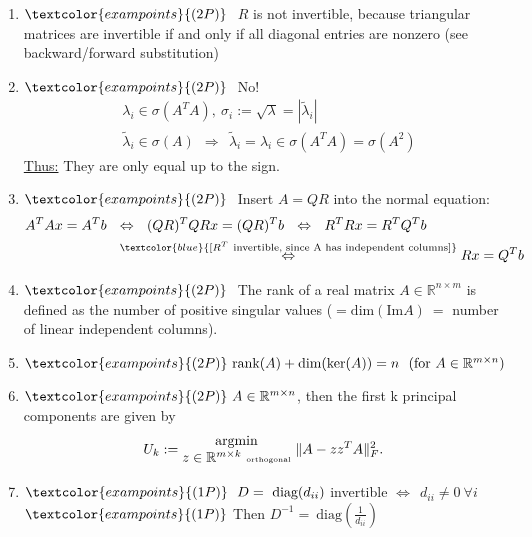 {\begin{enumerate}
	The drawback of this algorithm is the previous mentioned fact, that the resulting eigenvector is corresponded to the largest eigenvalue.\\
	The iterations are computed by $x^{k+1}:=\frac{Ax^k}{\|Ax^k\|}$.\\
	As an alternative you can use the Inverse Power iteration.
	\item 
	$\textcolor{exampoints}{(2P)}~$ $R$ is not invertible, because triangular matrices are invertible if and only if all diagonal entries are nonzero (see backward/forward substitution)
	\item 
	$\textcolor{exampoints}{(2P)}~$ No!
	\begin{align*}
	&\lambda_i\in\sigma(A^TA),~\sigma_i:=\sqrt{\lambda}=|\tilde{\lambda}_i|\\
	&\tilde{\lambda}_i\in\sigma(A)~~\Rightarrow~~\tilde{\lambda}_i=\lambda_i\in\sigma(A^TA)=\sigma(A^2)
	\end{align*}
	\underline{Thus:} They are only equal up to the sign.
	\item 
	$\textcolor{exampoints}{(2P)}~$ Insert $A=QR$ into the normal equation:
	\begin{align*}
	A^TAx=A^Tb~~&\Leftrightarrow~~(QR)^TQRx=(QR)^Tb~~\Leftrightarrow~~R^TRx=R^TQ^Tb\\
	&\stackrel{\textcolor{blue}{[R^T~\text{invertible, since A has independent columns}]}}{\Leftrightarrow}Rx=Q^Tb
	\end{align*}
	\item $\textcolor{exampoints}{(2P)}~$ The rank of a real matrix $A\in\mathbb{R}^{n\times m}$ is defined as the number of positive singular values ($=\text{dim}(\text{Im}A)~=$ number of linear independent columns).
	\item $\textcolor{exampoints}{(2P)}~\text{rank}(A)+\text{dim}(\text{ker}(A))=n~~(\text{for}~A\in\mathbb{R}^{m\times n})$
	\item 
	$\textcolor{exampoints}{(2P)}~A\in\mathbb{R}^{m\times n}$, then the first k principal components are given by
	$$
	U_k:=\begin{matrix}\text{argmin}\\
	{z\in\mathbb{R}^{m\times k}~\text{\tiny{orthogonal}}}\end{matrix}~\|A-zz^TA\|_{F}^2.
	$$	
	\item $\textcolor{exampoints}{(1P)}~~D=~\text{diag}(d_{ii})$ invertible $\Leftrightarrow~~d_{ii}\neq 0~\forall i$\\
	$\textcolor{exampoints}{(1P)}$ Then $D^{-1}=~\text{diag}(\frac{1}{d_{ii}})$

\end{enumerate}}
